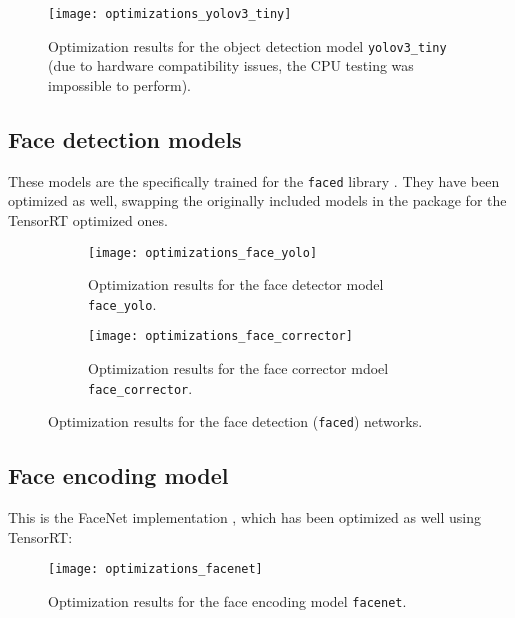 \begin{figure}[h!]
	\centering
	\texttt{[image: optimizations\_yolov3\_tiny]}
	\caption{Optimization results for the object detection model \texttt{yolov3\_tiny} (due to hardware compatibility issues, the CPU testing was impossible to perform).}
\end{figure}
\goodbreak
\subsection{Face detection models}

These models are the specifically trained for the \texttt{faced} library \cite{faced}. They have been optimized as well, swapping the originally included models in the package for the TensorRT optimized ones.


\begin{figure}[h!]
	\centering
	\begin{subfigure}[h]{0.45\linewidth}
		\centering
		\texttt{[image: optimizations\_face\_yolo]}
		\caption{Optimization results for the face detector model \texttt{face\_yolo}.}
	\end{subfigure}
	\hfill
	\begin{subfigure}[h]{0.45\linewidth}
		\centering
		\texttt{[image: optimizations\_face\_corrector]}
		\caption{Optimization results for the face corrector mdoel \texttt{face\_corrector}.}
	\end{subfigure}
	\caption{Optimization results for the face detection (\texttt{faced}) networks.}
\end{figure}




\subsection{Face encoding model}
This is the FaceNet implementation \cite{facenet}, which has been optimized as well using TensorRT:

\begin{figure}[h]
	\centering
	\texttt{[image: optimizations\_facenet]}
	\caption{Optimization results for the face encoding model \texttt{facenet}.}
\end{figure}